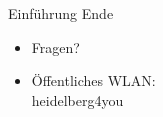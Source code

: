 	\begin{frame}
		\begin{center}
			\Huge Einführung Ende
		\end{center}
		\begin{center}
			\begin{itemize}
				\huge\pause\item Fragen?
				\huge\pause\item Öffentliches WLAN:\\
					heidelberg4you
			\end{itemize}
			
		\end{center}
	\end{frame}
	

